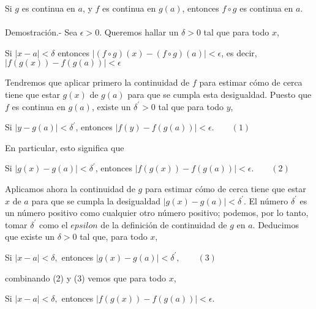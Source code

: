 \begin{teo} Si $g$ es continua en $a$, y $f$ es continua en $g(a)$, entonces $f\circ g$ es continua en $a$.\\\\
    Demostración.-\; Sea $\epsilon > 0$. Queremos hallar un $\delta > 0$ tal que para todo $x$, 

    \begin{center}
	Si $|x-a|<\delta$ entonces $|(f\circ g)(x)-(f\circ g)(a)|<\epsilon$, es decir, $|f(g(x))-f(g(a))|<\epsilon$
    \end{center}

	Tendremos que aplicar primero la continuidad de $f$ para estimar cómo de cerca tiene que estar $g(x)$ de $g(a)$ para que se cumpla esta desigualdad. Puesto que $f$ es continua en $g(a)$, existe un $\delta^{'} > 0$ tal que para todo $y$,

    \begin{center}
	Si $|y-g(a)|<\delta^{'}$, entonces $|f(y)-f(g(a))|<\epsilon. \qquad (1)$ 
    \end{center}

    En particular, esto significa que

    \begin{center}
	Si $|g(x)-g(a)|<\delta^{'}$, entonces $|f(g(x))-f(g(a))|<\epsilon. \qquad (2)$
    \end{center}
    
    Aplicamos ahora la continuidad de $g$ para estimar cómo de cerca tiene que estar $x$ de $a$ para que se cumpla la desigualdad $|g(x)-g(a)|<\delta^{'}$. El número $\delta^{'}$ es un número positivo como cualquier otro número positivo; podemos, por lo tanto, tomar $\delta^{'}$ como el $epsilon$ de la definición de continuidad de $g$ en $a$. Deducimos que existe un $\delta > 0$ tal que, para todo $x$,

    \begin{center}
	Si $|x-a|<\delta,$ entonces $|g(x)-g(a)|<\delta^{'}, \qquad (3)$
     \end{center}

     combinando (2) y (3) vemos que para todo $x$,

    \begin{center}
	Si $|x-a|<\delta,$ entonces $|f(g(x))-f(g(a))|<\epsilon.$
     \end{center}
     \vspace{1cm}

\end{teo}

